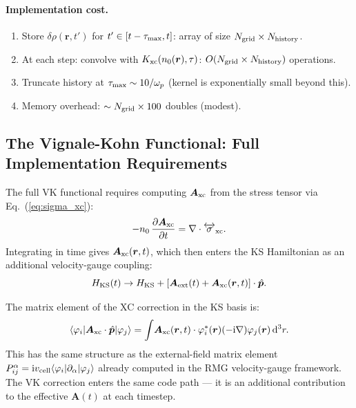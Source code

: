 \documentclass[12pt,letterpaper]{article}
\newcommand{\mel}[3]{\langle #1 \vert #2 \vert #3 \rangle}
\newcommand{\dd}{\mathrm{d}}
\newcommand{\ii}{\mathrm{i}}
\theoremstyle{definition}
\begin{document}
\paragraph{Implementation cost.}
\begin{enumerate}[noitemsep]
  \item Store $\delta\rho(\bm{r},t')$ for $t' \in [t-\tau_{\rm max}, t]$:
    array of size $N_{\rm grid}\times N_{\rm history}$.
  \item At each step: convolve with $K_{\rm xc}(n_0(\bm{r}),\tau)$:
    $O(N_{\rm grid}\times N_{\rm history})$ operations.
  \item Truncate history at $\tau_{\rm max}\sim 10/\omega_p$
    (kernel is exponentially small beyond this).
  \item Memory overhead: $\sim N_{\rm grid}\times 100$ doubles (modest).
\end{enumerate}

\subsection{The Vignale-Kohn Functional: Full Implementation Requirements}

The full VK functional requires computing $\bm{A}_{\rm xc}$ from
the stress tensor via Eq.~(\ref{eq:sigma_xc}):
\begin{equation}
  -n_0\,\frac{\partial\bm{A}_{\rm xc}}{\partial t}
  = \nabla\cdot\overleftrightarrow{\sigma}_{\rm xc}.
  \label{eq:Axc_from_sigma}
\end{equation}
Integrating in time gives $\bm{A}_{\rm xc}(\bm{r},t)$, which then
enters the KS Hamiltonian as an additional velocity-gauge coupling:
\begin{equation}
  H_{\rm KS}(t) \to H_{\rm KS} + [\bm{A}_{\rm ext}(t)
  + \bm{A}_{\rm xc}(\bm{r},t)]\cdot\hat{\bm{p}}.
  \label{eq:H_vk}
\end{equation}

The matrix element of the XC correction in the KS basis is:
\begin{equation}
  \mel{\varphi_i}{\bm{A}_{\rm xc}\cdot\hat{\bm{p}}}{\varphi_j}
  = \int\!\bm{A}_{\rm xc}(\bm{r},t)\cdot
    \varphi_i^*(\bm{r})(-\ii\nabla)\varphi_j(\bm{r})\,\dd^3r.
  \label{eq:vk_matrix}
\end{equation}
This has the same structure as the external-field matrix element
$P^\alpha_{ij} = \ii v_{\rm cell}\mel{\varphi_i}{\partial_\alpha}{\varphi_j}$
already computed in the RMG velocity-gauge framework.  The VK correction
enters the same code path --- it is an additional contribution to the
effective $\bm{A}(t)$ at each timestep.
\end{document}
